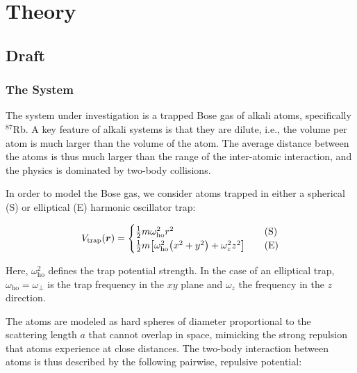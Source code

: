 \section{Theory}\label{sec:Theory}

\subsection{Draft}

\subsubsection*{The System}

The system under investigation is a trapped Bose gas of alkali atoms, specifically $^{87}$Rb. A key feature of alkali systems is that they are dilute, i.e., the volume per atom is much larger than the volume of the atom. The average distance between the atoms is thus much larger than the range of the inter-atomic interaction, and the physics is dominated by two-body collisions. 

In order to model the Bose gas, we consider atoms trapped in either a spherical (S) or elliptical (E) harmonic oscillator trap: 

\begin{equation}\label{eq:Vtrap}
    V_\mathrm{trap} \qty(\bm{r}) = 
    \begin{cases}
        \frac{1}{2} m \omega_\mathrm{ho}^2 r^2 \quad &\text{(S)}
        \\
        \frac{1}{2} m \qty[\omega_\mathrm{ho}^2 \qty(x^2 + y^2) + \omega_z^2 z^2] \quad &\text{(E)}
    \end{cases}
\end{equation}

Here, $\omega_\mathrm{ho}^2$ defines the trap potential strength. In the case of an elliptical trap, $\omega_\mathrm{ho}=\omega_\perp$ is the trap frequency in the $xy$ plane and $\omega_z$ the frequency in the $z$ direction. 

The atoms are modeled as hard spheres of diameter proportional to the scattering length $a$ that cannot overlap in space, mimicking the strong repulsion that atoms experience at close distances. The two-body interaction between atoms is thus described by the following pairwise, repulsive potential:

